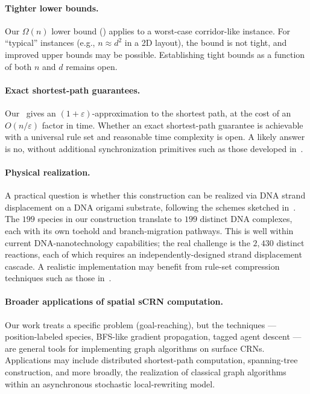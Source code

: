 \documentclass[11pt]{article}
\theoremstyle{plain}
\theoremstyle{definition}
\theoremstyle{remark}
\begin{document}
\paragraph{Tighter lower bounds.} Our $\Omega(n)$ lower bound () applies to a worst-case corridor-like instance. For ``typical'' instances (e.g., $n \approx d^2$ in a 2D layout), the bound is not tight, and improved upper bounds may be possible. Establishing tight bounds as a function of both $n$ and $d$ remains open.

\paragraph{Exact shortest-path guarantees.} Our~ gives an $(1+\varepsilon)$-approximation to the shortest path, at the cost of an $O(n/\varepsilon)$ factor in time. Whether an exact shortest-path guarantee is achievable with a universal rule set and reasonable time complexity is open. A likely answer is no, without additional synchronization primitives such as those developed in~\cite[\S 3.2]{clamons2020}.

\paragraph{Physical realization.} A practical question is whether this construction can be realized via DNA strand displacement on a DNA origami substrate, following the schemes sketched in~\cite{qian2014,clamons2020}. The $199$ species in our construction translate to $199$ distinct DNA complexes, each with its own toehold and branch-migration pathways. This is well within current DNA-nanotechnology capabilities; the real challenge is the $2{,}430$ distinct reactions, each of which requires an independently-designed strand displacement cascade. A realistic implementation may benefit from rule-set compression techniques such as those in~\cite{yu2024}.

\paragraph{Broader applications of spatial sCRN computation.} Our work treats a specific problem (goal-reaching), but the techniques — position-labeled species, BFS-like gradient propagation, tagged agent descent — are general tools for implementing graph algorithms on surface CRNs. Applications may include distributed shortest-path computation, spanning-tree construction, and more broadly, the realization of classical graph algorithms within an asynchronous stochastic local-rewriting model.



\end{document}
